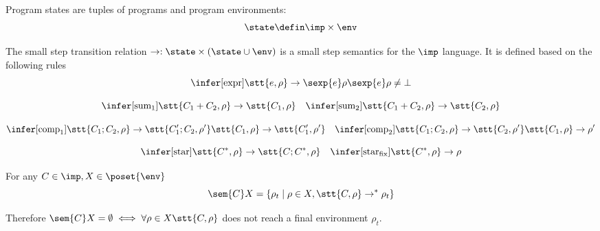 \begin{definition}
  Program states are tuples of programs and program
  environments: \[\state \defin \imp \times \env\]
\end{definition}

\begin{definition}\label{def:sosem}
  The small step transition relation \(\to : \state \times (\state
  \cup \env)\) is a small step semantics for the
  \(\imp\) language. It is defined based on the following rules
  \[\infer[\text{expr}]
          {\stt{e, \rho} \to \sexp{e}\rho}
          {\sexp{e}\rho \neq \bot}\]
          
          \[\infer[\text{sum}_1]
                  {\stt{C_1 + C_2, \rho} \to \stt{C_1, \rho}}
                  {} \quad
                  \infer[\text{sum}_2]
                        {\stt{C_1 + C_2, \rho} \to \stt{C_2, \rho}}
                        {}\]
                        
                        \[\infer[\text{comp}_1]
                                {\stt{C_1; C_2, \rho} \to \stt{C_1'; C_2, \rho'}}
                                {\stt{C_1, \rho} \to \stt{C_1', \rho'}} \quad
                                \infer[\text{comp}_2]
                                      {\stt{C_1; C_2, \rho} \to \stt{C_2, \rho'}}
                                      {\stt{C_1, \rho} \to \rho'}\]

                                      \[\infer[\text{star}]
                                              {\stt{C^*, \rho} \to \stt{C;C^*, \rho}}
                                              {} \quad
                                              \infer[\text{star}_{\text{fix}}]
                                                    {\stt{C^*, \rho} \to \rho}
                                                    {}\]
\end{definition}

\begin{lemma}\label{le:link}
  For any \(C\in\imp, X \in \poset{\env}\) \[\sem{C}X = \{\rho_t \mid
  \rho \in X, \stt{C, \rho} \to^* \rho_t\}\] 
\end{lemma}

Therefore \(\sem{C}X = \emptyset \iff \forall \rho \in X
\stt{C,\rho}\) does not reach a final environment \(\rho_t\).

